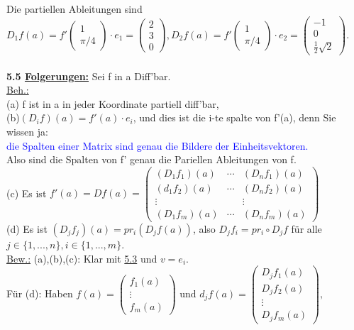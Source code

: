 \documentclass[]{scrartcl}
\begin{document}
	Die partiellen Ableitungen sind $D_1 f(a)=f'\begin{pmatrix}
		1\\\pi/4
	\end{pmatrix}\cdot e_1=\begin{pmatrix}
		2\\3\\0
	\end{pmatrix}, D_2f(a)=f'\begin{pmatrix}
		1\\\pi/4
	\end{pmatrix}\cdot e_2 =\begin{pmatrix}
		-1\\0\\\frac{1}{2}\sqrt{2}
	\end{pmatrix}.$\\
	\\
	\textbf{5.5 \underline{Folgerungen:}} Sei f in a Diff'bar.\\
	\underline{Beh.:}\\
	(a) f ist in a in jeder Koordinate partiell diff'bar,\\
	(b)\ul{$(D_if)(a)=f'(a)\cdot e_i$}, und dies ist die i-te spalte von f'(a), denn Sie wissen ja:\\
	\textcolor{blue}{die Spalten einer Matrix sind genau die Bildere der Einheitsvektoren.}\\
	Also sind die Spalten von f' genau die Pariellen Ableitungen von f.\\
	(c) Es ist $f'(a)=Df(a)=\begin{pmatrix}
		(D_1f_1)(a)& \cdots & (D_nf_1)(a)\\
		(d_1f_2)(a)& \cdots & (D_nf_2)(a)\\
		\vdots& & \vdots\\
		(D_1f_m)(a)&\cdots & (D_nf_m)(a)
	\end{pmatrix}$\\
	(d) Es ist \ul{$(D_jf_j)(a)=pr_i(D_jf(a))$}, also $D_jf_i=pr_i\circ D_jf$ für alle $j\in \{1,...,n\}, i\in \{1,...,m\}$.\\
	\underline{Bew.:} (a),(b),(c): Klar mit \ul{5.3} und $v=e_i$.\\
	Für (d): Haben $f(a)=\begin{pmatrix}
		f_1(a)\\\vdots\\f_m(a)
	\end{pmatrix}$ und $d_jf(a)=\begin{pmatrix}
		D_jf_1(a)\\D_jf_2(a)\\\vdots\\D_jf_m(a)
	\end{pmatrix},$\\
\end{document}
